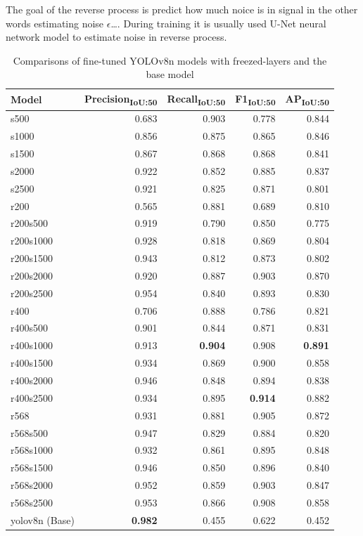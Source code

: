 The goal of the reverse process is predict how much noice is in signal in the other words estimating noise $\epsilon$\dots. During training it is usually used U-Net neural network model to estimate noise in reverse process.

\begin{table}[ht]
    \begin{tabular}{|l|r|r|r|r|}
    \hline
    Model & Precision\textsubscript{IoU:50} & Recall\textsubscript{IoU:50} & F1\textsubscript{IoU:50} & AP\textsubscript{IoU:50} \\
    \hline
    s500 & 0.683 & 0.903 & 0.778 & 0.844 \\
    s1000 & 0.856 & 0.875 & 0.865 & 0.846 \\
    s1500 & 0.867 & 0.868 & 0.868 & 0.841 \\
    s2000 & 0.922 & 0.852 & 0.885 & 0.837 \\
    s2500 & 0.921 & 0.825 & 0.871 & 0.801 \\
    \hline
    r200 & 0.565 & 0.881 & 0.689 & 0.810 \\
    r200s500 & 0.919 & 0.790 & 0.850 & 0.775\\
    r200s1000 & 0.928 & 0.818 & 0.869 & 0.804 \\
    r200s1500 & 0.943 & 0.812 & 0.873 & 0.802 \\
    r200s2000 & 0.920 & 0.887 & 0.903 & 0.870 \\
    r200s2500 & 0.954 & 0.840 & 0.893 & 0.830 \\
    \hline
    r400 & 0.706 & 0.888 & 0.786 & 0.821 \\
    r400s500 & 0.901 & 0.844 & 0.871 & 0.831 \\
    r400s1000 & 0.913 & \textbf{0.904} & 0.908 & \textbf{0.891} \\
    r400s1500 & 0.934 & 0.869 & 0.900 & 0.858 \\
    r400s2000 & 0.946 & 0.848 & 0.894 & 0.838 \\
    r400s2500 & 0.934 & 0.895 & \textbf{0.914} & 0.882 \\
    \hline
    r568 & 0.931 & 0.881 & 0.905 & 0.872 \\
    r568s500 & 0.947 & 0.829 & 0.884 & 0.820 \\
    r568s1000 & 0.932 & 0.861 & 0.895 & 0.848 \\
    r568s1500 & 0.946 & 0.850 & 0.896 & 0.840 \\
    r568s2000 & 0.952 & 0.859 & 0.903 & 0.847 \\
    r568s2500 & 0.953 & 0.866 & 0.908 & 0.858 \\
    \hline
    \hline
    yolov8n (Base) & \textbf{0.982} & 0.455 & 0.622 & 0.452 \\
    \hline
    \end{tabular}
    \caption{Comparisons of fine-tuned YOLOv8n models with freezed-layers and the base model} 
    \label{tab:results}
    \end{table}

